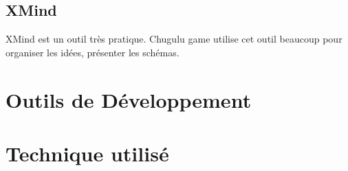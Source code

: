 
\subsection{XMind} %


XMind est un outil très pratique. Chugulu game utilise cet outil beaucoup pour organiser les idées, présenter les schémas. 



\section{Outils de Développement} %
\label{sec:outils_de_développement}


\section{Technique utilisé} %
\label{sec:technique_utilisé}



